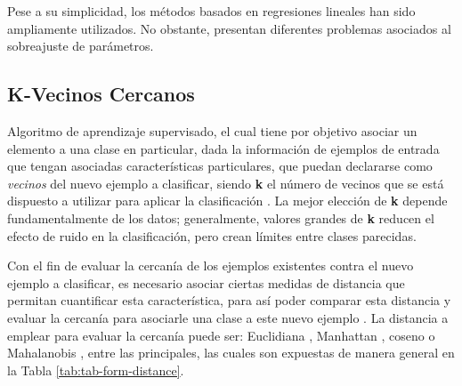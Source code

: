 Pese a su simplicidad, los métodos basados en regresiones lineales han sido ampliamente utilizados. No obstante, presentan diferentes problemas asociados al sobreajuste de parámetros.
 
\subsection{K-Vecinos Cercanos}

Algoritmo de aprendizaje supervisado, el cual tiene por objetivo asociar un elemento a una clase en particular, dada la información de ejemplos de entrada que tengan asociadas características particulares, que puedan declararse como \textit{vecinos} del nuevo ejemplo a clasificar, siendo \textbf{k} el número de vecinos que se está dispuesto a utilizar para aplicar la clasificación \cite{6313426}. La mejor elección de \textbf{k} depende fundamentalmente de los datos; generalmente, valores grandes de \textbf{k} reducen el efecto de ruido en la clasificación, pero crean límites entre clases parecidas.

Con el fin de evaluar la cercanía de los ejemplos existentes contra el nuevo ejemplo a clasificar, es necesario asociar ciertas medidas de distancia que permitan cuantificar esta característica, para así poder comparar esta distancia y evaluar la cercanía para asociarle una clase a este nuevo ejemplo \cite{5408784}. La distancia a emplear para evaluar la cercanía puede ser: Euclidiana \cite{DANIELSSON1980227}, Manhattan \cite{PERLIBAKAS2004711}, coseno \cite{LIAO20155328} o Mahalanobis \cite{DEMAESSCHALCK20001}, entre las principales, las cuales son expuestas de manera general en la Tabla \ref{tab:tab-form-distance}.

